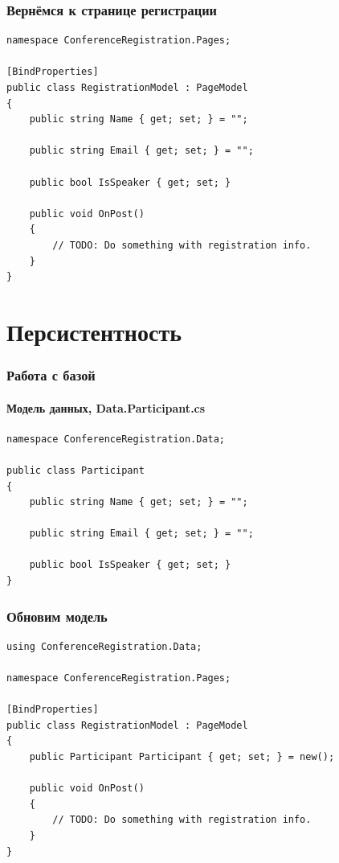 \documentclass{../../slides-style}
\begin{document}
    \begin{frame}[fragile]
        \frametitle{Вернёмся к странице регистрации}
        \begin{footnotesize}
            \begin{verbatim}
namespace ConferenceRegistration.Pages;

[BindProperties]
public class RegistrationModel : PageModel
{
    public string Name { get; set; } = "";

    public string Email { get; set; } = "";

    public bool IsSpeaker { get; set; }

    public void OnPost()
    {
        // TODO: Do something with registration info.
    }
}
            \end{verbatim}
        \end{footnotesize}
    \end{frame}

    \section{Персистентность}

    \begin{frame}[fragile]
        \frametitle{Работа с базой}
        \framesubtitle{Модель данных, Data.Participant.cs}
        \begin{footnotesize}
            \begin{verbatim}
namespace ConferenceRegistration.Data;

public class Participant
{
    public string Name { get; set; } = "";

    public string Email { get; set; } = "";

    public bool IsSpeaker { get; set; }
}
            \end{verbatim}
        \end{footnotesize}
    \end{frame}

    \begin{frame}[fragile]
        \frametitle{Обновим модель}
        \begin{footnotesize}
            \begin{verbatim}
using ConferenceRegistration.Data;

namespace ConferenceRegistration.Pages;

[BindProperties]
public class RegistrationModel : PageModel
{
    public Participant Participant { get; set; } = new();

    public void OnPost()
    {
        // TODO: Do something with registration info.
    }
}
            \end{verbatim}
        \end{footnotesize}
    \end{frame}
\end{document}
